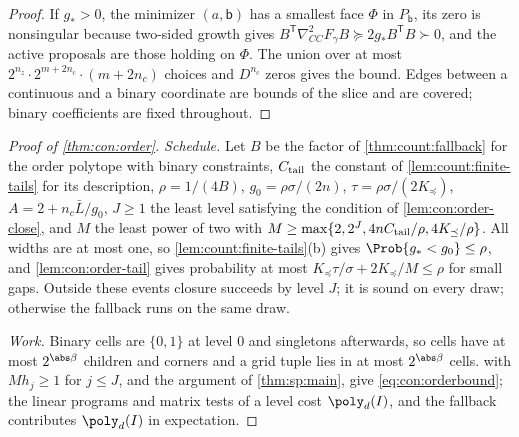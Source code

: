 \begin{proof}
If $g_*>0$, the minimizer $(a,\mathsf b)$ has a smallest face $\Phi$ in
$P_{\mathsf b}$, its zero is nonsingular because two-sided growth gives
$B^{\mathsf T}\nabla^2_{CC}F_\gamma B\succeq2g_*B^{\mathsf T}B\succ0$, and the
active proposals are those holding on $\Phi$. The union over at most
$2^{n_z}\cdot2^{m+2n_c}\cdot(m+2n_c)$ choices and $D^{n_c}$ zeros gives the
bound. Edges between a continuous and a binary coordinate are bounds of the
slice and are covered; binary coefficients are fixed throughout.
\end{proof}

\begin{proof}[Proof of \cref{thm:con:order}]
\emph{Schedule.} Let $B$ be the factor of \cref{thm:count:fallback} for the
order polytope with binary constraints, $C_{\rm tail}$ the constant of
\cref{lem:count:finite-tails} for its description, $\rho=1/(4B)$,
$g_0=\rho\sigma/(2n)$, $\tau=\rho\sigma/(2K_\preceq)$, $A=2+n_c\bar L/g_0$, $J\ge1$
the least level satisfying the condition of \cref{lem:con:order-close}, and
$M$ the least power of two with
$M\ge\max\{2,2^J,4nC_{\rm tail}/\rho,4K_\preceq/\rho\}$. All widths are at most
one, so \cref{lem:count:finite-tails}(b) gives $\Prob\{g_*<g_0\}\le\rho$, and
\cref{lem:con:order-tail} gives probability at most
$K_\preceq\tau/\sigma+2K_\preceq/M\le\rho$ for small gaps. Outside these events
closure succeeds by level $J$; it is sound on every draw; otherwise the
fallback runs on the same draw.

\emph{Work.} Binary cells are $\{0,1\}$ at level $0$ and singletons
afterwards, so cells have at most $2^{\abs\beta}$ children and corners and a
grid tuple lies in at most $2^{\abs\beta}$ cells. 
with $Mh_j\ge1$ for $j\le J$, and the argument of \cref{thm:sp:main}, give
\eqref{eq:con:orderbound}; the linear programs and matrix tests of a level
cost $\poly_d(I)$, and the fallback contributes $\poly_d(I)$ in expectation.


\end{proof}
